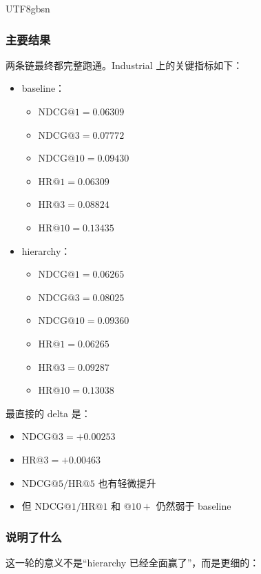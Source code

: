 \documentclass[11pt]{article}
\begin{document}
\begin{CJK*}{UTF8}{gbsn}
\subsubsection*{主要结果}

两条链最终都完整跑通。Industrial 上的关键指标如下：

\begin{itemize}
  \item baseline：
  \begin{itemize}
    \item \(\mathrm{NDCG}@1 = 0.06309\)
    \item \(\mathrm{NDCG}@3 = 0.07772\)
    \item \(\mathrm{NDCG}@10 = 0.09430\)
    \item \(\mathrm{HR}@1 = 0.06309\)
    \item \(\mathrm{HR}@3 = 0.08824\)
    \item \(\mathrm{HR}@10 = 0.13435\)
  \end{itemize}
  \item hierarchy：
  \begin{itemize}
    \item \(\mathrm{NDCG}@1 = 0.06265\)
    \item \(\mathrm{NDCG}@3 = 0.08025\)
    \item \(\mathrm{NDCG}@10 = 0.09360\)
    \item \(\mathrm{HR}@1 = 0.06265\)
    \item \(\mathrm{HR}@3 = 0.09287\)
    \item \(\mathrm{HR}@10 = 0.13038\)
  \end{itemize}
\end{itemize}

最直接的 delta 是：

\begin{itemize}
  \item \(\mathrm{NDCG}@3 = +0.00253\)
  \item \(\mathrm{HR}@3 = +0.00463\)
  \item \(\mathrm{NDCG}@5 / \mathrm{HR}@5\) 也有轻微提升
  \item 但 \(\mathrm{NDCG}@1 / \mathrm{HR}@1\) 和 \( @10+ \) 仍然弱于 baseline
\end{itemize}

\subsubsection*{说明了什么}

这一轮的意义不是“hierarchy 已经全面赢了”，而是更细的：


\end{CJK*}
\end{document}
